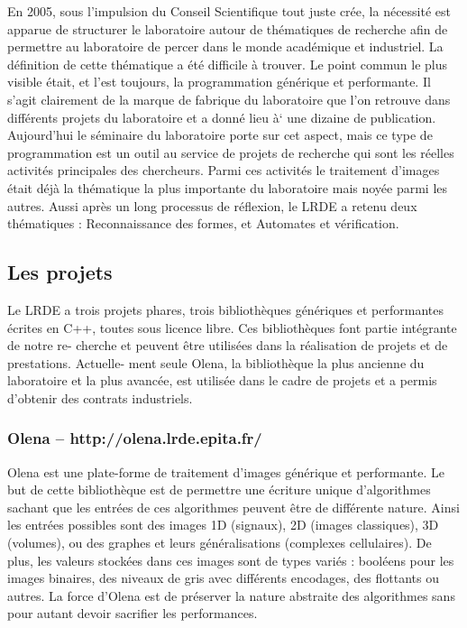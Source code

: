 \documentclass[a4paper,11pt,twoside,final]{article}
\begin{document}
  En 2005, sous l'impulsion du Conseil Scientifique tout juste crée, la
  nécessité est apparue de structurer le laboratoire autour de thématiques de
  recherche afin de permettre au laboratoire de percer dans le monde académique
  et industriel. La définition de cette thématique a été difficile à trouver.
  Le point commun le plus visible était, et l'est toujours, la programmation
  générique et performante. Il s’agit clairement de la marque de fabrique du
  laboratoire que l'on retrouve dans différents projets du laboratoire et a
  donné lieu à` une dizaine de publication. Aujourd'hui le séminaire du
  laboratoire porte sur cet aspect, mais ce type de programmation est un outil
  au service de projets de recherche qui sont les réelles activités principales
  des chercheurs. Parmi ces activités le traitement d'images était déjà la
  thématique la plus importante du laboratoire mais noyée parmi les autres.
  Aussi après un long processus de réflexion, le LRDE a retenu deux thématiques
  : Reconnaissance des formes, et Automates et vérification.

  \subsection{Les projets}

  Le LRDE a trois projets phares, trois bibliothèques génériques et
  performantes écrites en C++, toutes sous licence libre. Ces bibliothèques
  font partie intégrante de notre re- cherche et peuvent être utilisées dans la
  réalisation de projets et de prestations. Actuelle- ment seule Olena, la
  bibliothèque la plus ancienne du laboratoire et la plus avancée, est utilisée
  dans le cadre de projets et a permis d’obtenir des contrats industriels.

  \subsubsection{Olena – http://olena.lrde.epita.fr/}

  Olena est une plate-forme de traitement d’images générique et performante. Le
  but de cette bibliothèque est de permettre une écriture unique d’algorithmes
  sachant que les entrées de ces algorithmes peuvent être de différente nature.
  Ainsi les entrées possibles sont des images 1D (signaux), 2D (images
  classiques), 3D (volumes), ou des graphes et leurs généralisations (complexes
  cellulaires). De plus, les valeurs stockées dans ces images sont de types
  variés : booléens pour les images binaires, des niveaux de gris avec
  différents encodages, des flottants ou autres. La force d’Olena est de
  préserver la nature abstraite des algorithmes sans pour autant devoir
  sacrifier les performances.
\end{document}
